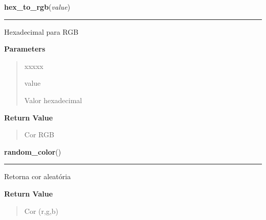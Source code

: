 \hspace{.8\funcindent}\begin{boxedminipage}{\funcwidth}

    \raggedright \textbf{hex\_to\_rgb}(\textit{value})

    \vspace{-1.5ex}

    \rule{\textwidth}{0.5\fboxrule}
\setlength{\parskip}{2ex}
    Hexadecimal para RGB

\setlength{\parskip}{1ex}
      \textbf{Parameters}
      \vspace{-1ex}

      \begin{quote}
        \begin{Ventry}{xxxxx}

          \item[value]

          Valor hexadecimal

        \end{Ventry}

      \end{quote}

      \textbf{Return Value}
    \vspace{-1ex}

      \begin{quote}
      Cor RGB

      \end{quote}

    \end{boxedminipage}

    \label{color:Color:random_color}

    \vspace{0.5ex}

\hspace{.8\funcindent}\begin{boxedminipage}{\funcwidth}

    \raggedright \textbf{random\_color}()

    \vspace{-1.5ex}

    \rule{\textwidth}{0.5\fboxrule}
\setlength{\parskip}{2ex}
    Retorna cor aleatória

\setlength{\parskip}{1ex}
      \textbf{Return Value}
    \vspace{-1ex}

      \begin{quote}
      Cor (r,g,b)

      \end{quote}

    \end{boxedminipage}

